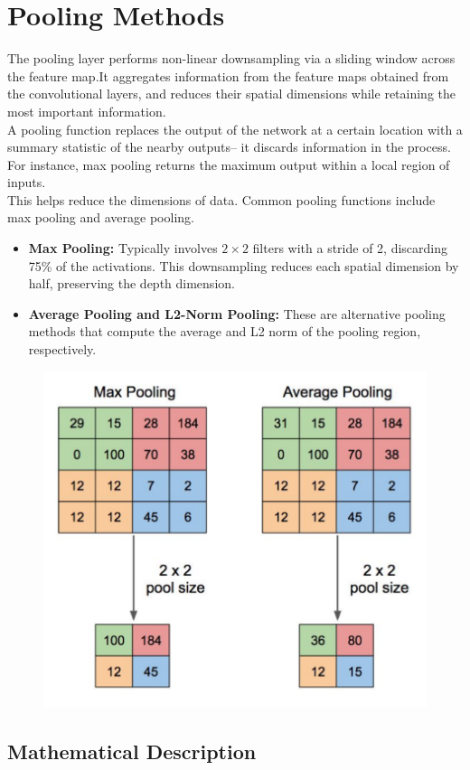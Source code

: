 \section{Pooling Methods}

The pooling layer performs non-linear downsampling via a sliding window across the feature map.It aggregates information from the feature maps obtained from the convolutional layers, and reduces their spatial dimensions while retaining the most important information.\\

A pooling function replaces the output of the network at a certain location with a summary statistic of the nearby outputs– it discards information in the process. For instance, max pooling returns the maximum output within a local region of inputs.\\

This helps reduce the dimensions of data. Common pooling functions include max pooling and average pooling.

\begin{itemize}
    \item \textbf{Max Pooling:} Typically involves \( 2 \times 2 \) filters with a stride of 2, discarding 75\% of the activations. This downsampling reduces each spatial dimension by half, preserving the depth dimension.
    \item \textbf{Average Pooling and L2-Norm Pooling:} These are alternative pooling methods that compute the average and L2 norm of the pooling region, respectively.
\end{itemize}



\begin{figure}[H]
    \centering
    \includegraphics[width=0.4\linewidth]{img/pooling.png}
    
    
\end{figure}

\subsection{Mathematical Description}

